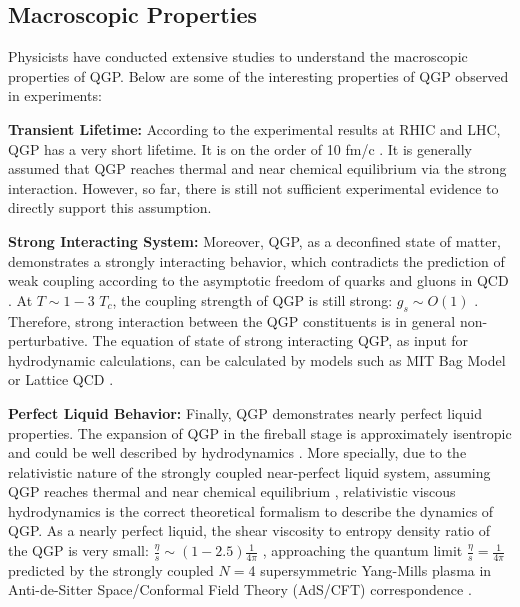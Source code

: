 
\subsection{Macroscopic Properties}

Physicists have conducted extensive studies to understand the macroscopic properties of QGP. Below are some of the interesting properties of QGP observed in experiments:

\textbf{Transient Lifetime:} According to the experimental results at RHIC and LHC, QGP has a very short lifetime. It is on the order of 10 fm/c \cite{QGPLifeTime}. It is generally assumed that QGP reaches thermal \cite{QGPThermal} and near chemical equilibrium \cite{QGPChemical} via the strong interaction. However, so far, there is still not sufficient experimental evidence to directly support this assumption.

\textbf{Strong Interacting System:} Moreover, QGP, as a deconfined state of matter, demonstrates a strongly interacting behavior, which contradicts the prediction of weak coupling according to the asymptotic freedom of quarks and gluons in QCD \cite{QCDAsym}. At $T \sim 1 - 3$ $T_c$, the coupling strength of QGP is still strong: $g_s \sim O(1)$ \cite{sQGP}. Therefore, strong interaction between the QGP constituents is in general non-perturbative. The equation of state of strong interacting QGP, as input for hydrodynamic calculations, can be calculated by models such as MIT Bag Model \cite{MITBag} or Lattice QCD \cite{LatticeEOS}. 

\textbf{Perfect Liquid Behavior:} Finally, QGP demonstrates nearly perfect liquid properties. The expansion of QGP in the fireball stage is approximately isentropic and could be well described by hydrodynamics \cite{Bjorken}. More specially, due to the relativistic nature of the strongly coupled near-perfect liquid system, assuming QGP reaches thermal \cite{QGPThermal} and near chemical equilibrium \cite{QGPChemical}, relativistic viscous hydrodynamics \cite{4DHydro} is the correct theoretical formalism to describe the dynamics of QGP. As a nearly perfect liquid, the shear viscosity to entropy density ratio of the QGP is very small: $\frac{\eta}{s}\sim (1 - 2.5) \frac{1}{4\pi}$ \cite{QGPEtaOverS}, approaching the quantum limit $\frac{\eta}{s} = \frac{1}{4\pi}$ predicted by the strongly coupled $N=$4 supersymmetric Yang-Mills plasma in Anti-de-Sitter Space/Conformal Field Theory (AdS/CFT) correspondence \cite{ADSCFT}.

